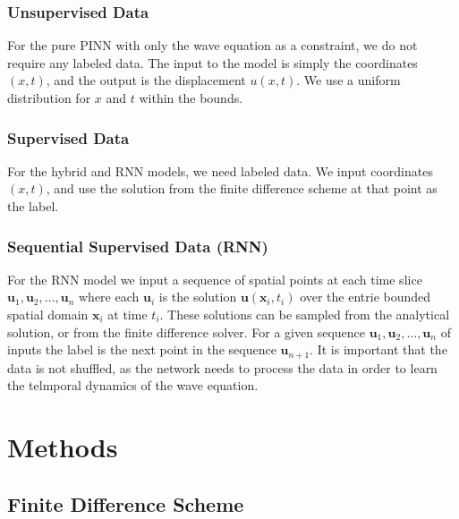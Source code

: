 \documentclass[twoside,11pt]{report}
\begin{document}
    \subsubsection{Unsupervised Data}
    For the pure PINN with only the wave equation as a constraint, we do not require any labeled data.
    The input to the model is simply the coordinates $(x,t)$, and the output is the displacement $u(x,t)$. 
    We use a uniform distribution for $x$ and $t$ within the bounds.
    \subsubsection{Supervised Data}
    For the hybrid and RNN models, we need labeled data. We input coordinates $(x,t)$,
    and use the solution from the finite difference scheme at that point as the label.
    \subsubsection{Sequential Supervised Data (RNN)}
    For the RNN model we input a sequence of spatial points at each time slice 
    $\mathbf{u}_1, \mathbf{u}_2, \dots, \mathbf{u}_n$ where each $\mathbf{u}_i$ is the 
    solution $\mathbf{u}(\mathbf{x}_i,t_i)$
    over the entrie bounded spatial domain $\mathbf{x}_i$ at time $t_i$. These solutions can be sampled from the analytical
    solution, or from the finite difference solver.
    For a given sequence $\mathbf{u}_1, \mathbf{u}_2, \dots, \mathbf{u}_n$ of inputs the 
    label is the next point in the sequence
    $\mathbf{u}_{n+1}$.
    It is important that the data is not shuffled, as the network needs to process the data in order to learn the
    telmporal dynamics of the wave equation.
    

\section{Methods}
\label{sec:methods}



\subsection{Finite Difference Scheme}
\label{sec:finite}
\end{document}
